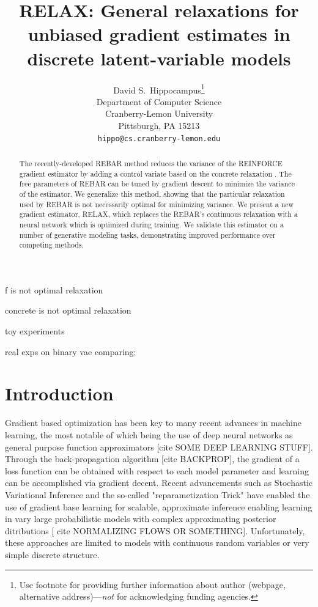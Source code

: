 \documentclass{article}
\title{RELAX: General relaxations for unbiased gradient estimates in discrete latent-variable models}
\author{
  David S.~Hippocampus\thanks{Use footnote for providing further
    information about author (webpage, alternative
    address)---\emph{not} for acknowledging funding agencies.} \\
  Department of Computer Science\\
  Cranberry-Lemon University\\
  Pittsburgh, PA 15213 \\
  \texttt{hippo@cs.cranberry-lemon.edu} \\
}
\begin{document}
\maketitle
\begin{abstract}
The recently-developed REBAR method \citep{tucker2017rebar} reduces the variance of the REINFORCE gradient estimator by adding a control variate based on the concrete relaxation \citep{maddison2016concrete}.
The free parameters of REBAR can be tuned by gradient descent to minimize the variance of the estimator.
We generalize this method, showing that the particular relaxation used by REBAR is not necessarily optimal for minimizing variance. We present a new gradient estimator, RELAX, which replaces the REBAR's continuous relaxation with a neural network which is optimized during training. We validate this estimator on a number of generative modeling tasks, demonstrating improved performance over competing methods. 
\end{abstract}



f is not optimal relaxation

concrete is not optimal relaxation

toy experiments

real exps on binary vae comparing:







\section{Introduction}
Gradient based optimization has been key to many recent advances in machine learning, the most notable of which being the use of deep neural networks as general purpose function approximators [cite SOME DEEP LEARNING STUFF].
Through the back-propagation algorithm [cite BACKPROP], the gradient of a loss function can be obtained with respect to each model parameter and learning can be accomplished via gradient decent.
Recent advancements such as Stochastic Variational Inference \cite{SVI} and the so-called "reparametization Trick" \cite{VAE} have enabled the use of gradient base learning for scalable, approximate inference enabling learning in vary large probabilistic models with complex approximating posterior ditributions [ cite NORMALIZING FLOWS OR SOMETHING].
Unfortunately, these approaches are limited to models with continuous random variables or very simple discrete structure. 
\end{document}
